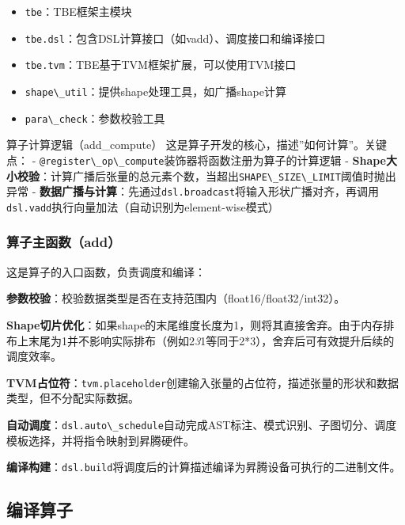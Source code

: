 \begin{itemize}
\tightlist
\item
  \passthrough{\lstinline!tbe!}：TBE框架主模块
\item
  \passthrough{\lstinline!tbe.dsl!}：包含DSL计算接口（如vadd）、调度接口和编译接口
\item
  \passthrough{\lstinline!tbe.tvm!}：TBE基于TVM框架扩展，可以使用TVM接口
\item
  \passthrough{\lstinline!shape\_util!}：提供shape处理工具，如广播shape计算
\item
  \passthrough{\lstinline!para\_check!}：参数校验工具
\end{itemize}

算子计算逻辑（add\_compute）
这是算子开发的核心，描述''如何计算''。关键点： -
\passthrough{\lstinline!@register\_op\_compute!}装饰器将函数注册为算子的计算逻辑
-
\textbf{Shape大小校验}：计算广播后张量的总元素个数，当超出\passthrough{\lstinline!SHAPE\_SIZE\_LIMIT!}阈值时抛出异常
-
\textbf{数据广播与计算}：先通过\passthrough{\lstinline!dsl.broadcast!}将输入形状广播对齐，再调用\passthrough{\lstinline!dsl.vadd!}执行向量加法（自动识别为element-wise模式）

\subsubsection{算子主函数（add）}\label{src-book-chapter7-h24}

这是算子的入口函数，负责调度和编译：

\textbf{参数校验}：校验数据类型是否在支持范围内（float16/float32/int32）。

\textbf{Shape切片优化}：如果shape的末尾维度长度为1，则将其直接舍弃。由于内存排布上末尾为1并不影响实际排布（例如2\emph{3}1等同于2*3），舍弃后可有效提升后续的调度效率。

\textbf{TVM占位符}：\passthrough{\lstinline!tvm.placeholder!}创建输入张量的占位符，描述张量的形状和数据类型，但不分配实际数据。

\textbf{自动调度}：\passthrough{\lstinline!dsl.auto\_schedule!}自动完成AST标注、模式识别、子图切分、调度模板选择，并将指令映射到昇腾硬件。

\textbf{编译构建}：\passthrough{\lstinline!dsl.build!}将调度后的计算描述编译为昇腾设备可执行的二进制文件。

\subsection{编译算子}\label{src-book-chapter7-h25}

